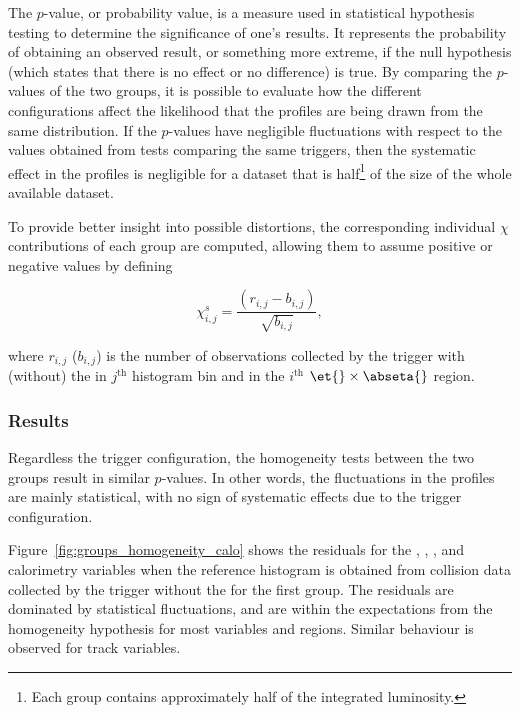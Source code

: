 The $p$-value, or probability value, is a measure used in statistical hypothesis testing to determine the significance of one's results. It represents the probability of obtaining an observed result, or something more extreme, if the null hypothesis (which states that there is no effect or no difference) is true. By comparing the $p$-values of the two groups, it is possible to evaluate how the different configurations affect the likelihood that the profiles are being drawn from the same distribution.  If the $p$-values have negligible fluctuations with respect to the values obtained from tests comparing the same triggers, then the systematic effect in the profiles is negligible for a dataset that is half\footnote{Each group contains approximately half of the integrated luminosity.} of the size of the whole available dataset.


To provide better insight into possible distortions, the corresponding 
individual $\chi$ contributions of each group are computed, allowing them to 
assume positive or negative values by defining

\begin{equation}
  \chi_{i,j}^{s} = \frac{(r_{i,j} - b_{i,j})}{\sqrt{b_{i,j}}},
  \label{eq:signed_chi}
\end{equation}

\noindent where $r_{i,j}$ ($b_{i,j}$) is the number of observations collected by
the trigger with (without) the \rnn{} in $j^\text{th}$ histogram bin and in the $i^\text{th}$
$\et{}\times\abseta{}$ region.


\subsubsection{Results}\label{top:agreement_homogeneity_results}




Regardless the trigger configuration, the homogeneity tests between the two groups result in similar $p$-values. In other words, the fluctuations in the profiles are mainly statistical, with no sign of systematic effects due to the trigger configuration. 

Figure~\ref{fig:groups_homogeneity_calo} shows the residuals for the \reta, \rphi, \eratio, and \rhad calorimetry variables when the reference histogram is obtained from collision data collected by the trigger without the \rnn{} for the first group. The residuals are dominated by statistical fluctuations, and are within the expectations from the homogeneity hypothesis for most variables and regions. Similar behaviour is observed for track variables. 

